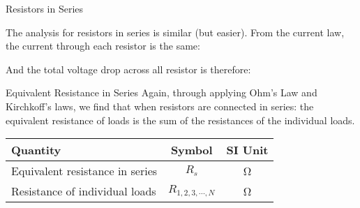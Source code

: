 \documentclass[12pt,aspectratio=169]{beamer}
\newcommand{\eq}[2]{\vspace{#1}{\Large\begin{displaymath}#2\end{displaymath}}}
\begin{document}
\begin{frame}{Resistors in Series}
  \begin{center}
  \end{center}

  \vspace{.1in}The analysis for resistors in series is similar (but easier).
  From the current law, the current through each resistor is the same:

  \eq{-.2in}{I_1=I_2=I_3=\cdots=I}

  \vspace{-.15in}And the total voltage drop across all resistor is therefore:

  \eq{-.3in}{V=V_1+V_2+V_3+\cdots=I(R_1+R_2+R_3+\cdots)}
\end{frame}



\begin{frame}{Equivalent Resistance in Series}
  Again, through applying Ohm's Law and Kirchkoff's laws, we find that when
  resistors are connected in series: the equivalent resistance of loads is the
  sum of the resistances of the individual loads.
  
  \eq{-.2in}{
    \boxed{R_s=\sum_{i=1}^{N}R_i}
  }
  \begin{center}
    \begin{tabular}{l|c|c}
      \rowcolor{pink}
      \textbf{Quantity} & \textbf{Symbol} & \textbf{SI Unit} \\ \hline
      Equivalent resistance in series & $R_s$ & \si{\ohm} \\
      Resistance of individual loads & $R_{1,2,3,\cdots,N}$ & \si{\ohm}
    \end{tabular}
  \end{center}
\end{frame}
\end{document}
